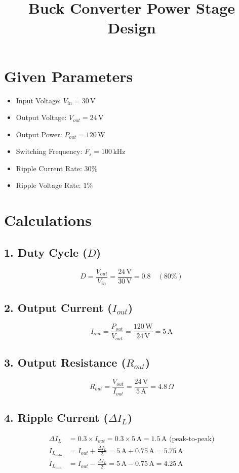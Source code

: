 \documentclass{article}
\begin{document}
\title{Buck Converter Power Stage Design}
\author{}
\date{}
\maketitle

\section*{Given Parameters}
\begin{itemize}
    \item Input Voltage: \( V_{in} = 30\,\text{V} \)
    \item Output Voltage: \( V_{out} = 24\,\text{V} \)
    \item Output Power: \( P_{out} = 120\,\text{W} \)
    \item Switching Frequency: \( F_s = 100\,\text{kHz} \)
    \item Ripple Current Rate: \( 30\% \)
    \item Ripple Voltage Rate: \( 1\% \)
\end{itemize}

\section*{Calculations}
\subsection*{1. Duty Cycle (\(D\))}
\[
D = \frac{V_{out}}{V_{in}} = \frac{24\,\text{V}}{30\,\text{V}} = 0.8 \quad (80\%)
\]

\subsection*{2. Output Current (\(I_{out}\))}
\[
I_{out} = \frac{P_{out}}{V_{out}} = \frac{120\,\text{W}}{24\,\text{V}} = 5\,\text{A}
\]

\subsection*{3. Output Resistance (\(R_{out}\))}
\[
R_{out} = \frac{V_{out}}{I_{out}} = \frac{24\,\text{V}}{5\,\text{A}} = 4.8\,\Omega
\]

\subsection*{4. Ripple Current (\(\Delta I_L\))}
\begin{align*}
\Delta I_L &= 0.3 \times I_{out} = 0.3 \times 5\,\text{A} = 1.5\,\text{A (peak-to-peak)} \\
I_{L_{\text{max}}} &= I_{out} + \frac{\Delta I_L}{2} = 5\,\text{A} + 0.75\,\text{A} = 5.75\,\text{A} \\
I_{L_{\text{min}}} &= I_{out} - \frac{\Delta I_L}{2} = 5\,\text{A} - 0.75\,\text{A} = 4.25\,\text{A}
\end{align*}
\end{document}
